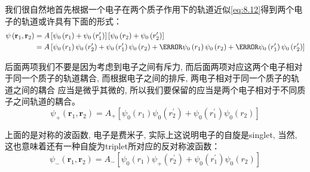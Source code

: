\documentclass[a4paper,zihao=-4,linespread=1]{ctexrep}
\begin{document}
    我们很自然地首先根据一个电子在两个质子作用下的轨道近似\ref{eq:8.12}得到两个电子的轨道或许具有下面的形式：
    \begin{equation}
        \begin{aligned}
            \psi\left(\mathbf{r}_{1}, \mathbf{r}_{2}\right)&=A\left[{\psi_{0}\left(r_{1}\right)+\psi_{0}\left(r_{1}^{\prime}\right)}\right]\left[{\psi_{0}\left(r_{2}\right)+\psi_{0}\left(r_{2}^{\prime}\right)}\right]\\
            &=A\left[\psi_{0}\left(r_{1}\right) \psi_{0}\left(r_{2}^{\prime}\right)+\psi_{0}\left(r_{1}^{\prime}\right) \psi_{0}\left(r_{2}\right)+\cancel{\psi_{0}\left(r_{1}\right) \psi_{0}\left(r_{2}\right)}+\cancel{\psi_{0}\left(r_{1}^{\prime}\right) \psi_{0}\left(r_{2}^{\prime}\right)}\right]
        \end{aligned}
    \end{equation}
    
    后面两项我们不要是因为考虑到电子之间有斥力, 而后面两项对应这两个电子相对于同一个质子的轨道耦合, 而根据电子之间的排斥, 两电子相对于同一个质子的轨道之间的耦合
    应当是微乎其微的, 所以我们要保留的应当是两个电子相对于不同质子之间轨道的耦合。
    \[\psi_{+}\left(\mathbf{r}_{1}, \mathbf{r}_{2}\right)=A_{+}\left[\psi_{0}\left(r_{1}\right) \psi_{0}\left(r_{2}^{\prime}\right)+\psi_{0}\left(r_{1}^{\prime}\right) \psi_{0}\left(r_{2}\right)\right]\]
    
    上面的是对称的波函数, 电子是费米子, 实际上这说明电子的自旋是singlet, 当然, 这也意味着还有一种自旋为triplet所对应的反对称波函数：
    \[\psi_{-}\left(\mathbf{r}_{1}, \mathbf{r}_{2}\right)=A_{-}\left[\psi_{0}\left(r_{1}\right) \psi_{+}\left(r_{2}^{\prime}\right)+\psi_{0}\left(r_{1}^{\prime}\right) \psi_{0}\left(r_{2}\right)\right]\]
    
\end{document}
